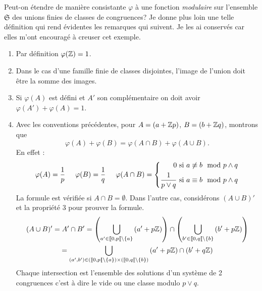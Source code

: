 \noindent Peut-on étendre de manière consistante $\varphi$ à une fonction \emph{modulaire} sur l'ensemble $\mathfrak{S}$ des unions finies de classes de congruences?\newline
Je donne plus loin une telle définition qui rend évidentes les remarques qui suivent. Je les ai conservés car elles m'ont encouragé à creuser cet exemple.
\begin{enumerate}
  \item Par définition $\varphi(\mathbb{Z}) = 1$.
  \item Dans le cas d'une famille finie de classes disjointes, l'image de l'union doit être la somme des images.
  \item Si $\varphi(A)$ est défini et $A'$ son complémentaire on doit avoir $\varphi(A') + \varphi(A) = 1$.
  \item Avec les conventions précédentes, pour $A = \left(a + \mathbb{Z} p\right)$, $B = \left(b + \mathbb{Z} q\right)$, montrons que
  \begin{displaymath}
    \varphi(A) + \varphi(B) = \varphi(A\cap B) + \varphi(A \cup B).
  \end{displaymath}
  En effet :
  \begin{displaymath}
    \varphi(A) = \frac{1}{p} \hspace{0.5cm}
    \varphi(B) = \frac{1}{q} \hspace{0.5cm}
    \varphi(A \cap B) =
    \left\lbrace
      \begin{aligned}
        0 &\text{ si } a \not \equiv b \mod p\wedge q\\
        \frac{1}{p\vee q} &\text{ si } a \equiv b \mod p\wedge q
      \end{aligned}
    \right.
  \end{displaymath}
  La formule est vérifiée si $A\cap B = \emptyset$. Dans l'autre cas, considérons $(A\cup B)'$ et la propriété 3 pour prouver la formule.
\begin{multline*}
  (A \cup B)' = A' \cap B'
  =     \left( \bigcup_{a'\in \llbracket 0, p\llbracket \setminus\{a\} } \left(a' + p\mathbb{Z}\right)\right)
   \cap \left( \bigcup_{b'\in \llbracket 0, q\llbracket \setminus\{b\} } \left(b' + p\mathbb{Z}\right)\right) \\
  = \bigcup_{(a',b')\in (\llbracket 0, p\llbracket \setminus\{a\}) \times (\llbracket 0, q\llbracket \setminus\{b\})} \left(a' + p\mathbb{Z}\right)\cap \left(b' + q\mathbb{Z}\right)
\end{multline*}
Chaque intersection est l'ensemble des solutions d'un système de 2 congruences c'est à dire le vide ou une classe modulo $p\vee q$.\newline

\end{enumerate}
